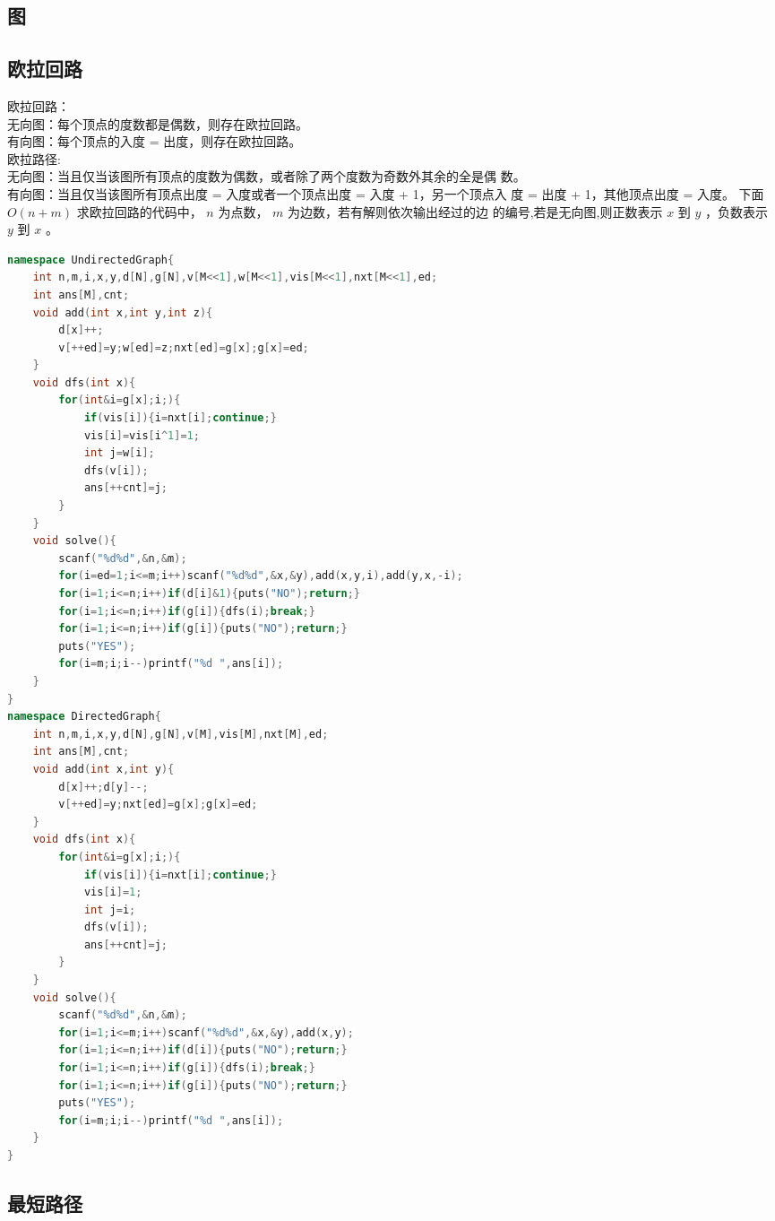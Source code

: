 \documentclass{article}
\begin{document}
\begin{CJK}{UTF8}{song}
\section{图}
\subsection{欧拉回路}
欧拉回路： \\
无向图：每个顶点的度数都是偶数，则存在欧拉回路。 \\
有向图：每个顶点的入度 = 出度，则存在欧拉回路。 \\
欧拉路径: \\
无向图：当且仅当该图所有顶点的度数为偶数，或者除了两个度数为奇数外其余的全是偶
数。 \\
有向图：当且仅当该图所有顶点出度 = 入度或者一个顶点出度 = 入度 + 1，另一个顶点入
度 = 出度 + 1，其他顶点出度 = 入度。
下面 $O(n + m)$ 求欧拉回路的代码中， $n$ 为点数， $m$ 为边数，若有解则依次输出经过的边
的编号,若是无向图,则正数表示 $x$ 到 $y$ ，负数表示 $y$ 到 $x$ 。
\begin{lstlisting}[language=C++]
namespace UndirectedGraph{
	int n,m,i,x,y,d[N],g[N],v[M<<1],w[M<<1],vis[M<<1],nxt[M<<1],ed;
	int ans[M],cnt;
	void add(int x,int y,int z){
		d[x]++;
		v[++ed]=y;w[ed]=z;nxt[ed]=g[x];g[x]=ed;
	}
	void dfs(int x){
		for(int&i=g[x];i;){
			if(vis[i]){i=nxt[i];continue;}
			vis[i]=vis[i^1]=1;
			int j=w[i];
			dfs(v[i]);
			ans[++cnt]=j;
		}
	}
	void solve(){
		scanf("%d%d",&n,&m);
		for(i=ed=1;i<=m;i++)scanf("%d%d",&x,&y),add(x,y,i),add(y,x,-i);
		for(i=1;i<=n;i++)if(d[i]&1){puts("NO");return;}
		for(i=1;i<=n;i++)if(g[i]){dfs(i);break;}
		for(i=1;i<=n;i++)if(g[i]){puts("NO");return;}
		puts("YES");
		for(i=m;i;i--)printf("%d ",ans[i]);
	}
}
namespace DirectedGraph{
	int n,m,i,x,y,d[N],g[N],v[M],vis[M],nxt[M],ed;
	int ans[M],cnt;
	void add(int x,int y){
		d[x]++;d[y]--;
		v[++ed]=y;nxt[ed]=g[x];g[x]=ed;
	}
	void dfs(int x){
		for(int&i=g[x];i;){
			if(vis[i]){i=nxt[i];continue;}
			vis[i]=1;
			int j=i;
			dfs(v[i]);
			ans[++cnt]=j;
		}
	}
	void solve(){
		scanf("%d%d",&n,&m);
		for(i=1;i<=m;i++)scanf("%d%d",&x,&y),add(x,y);
		for(i=1;i<=n;i++)if(d[i]){puts("NO");return;}
		for(i=1;i<=n;i++)if(g[i]){dfs(i);break;}
		for(i=1;i<=n;i++)if(g[i]){puts("NO");return;}
		puts("YES");
		for(i=m;i;i--)printf("%d ",ans[i]);
	}
}
\end{lstlisting}
\subsection{最短路径}

\end{CJK}
\end{document}
